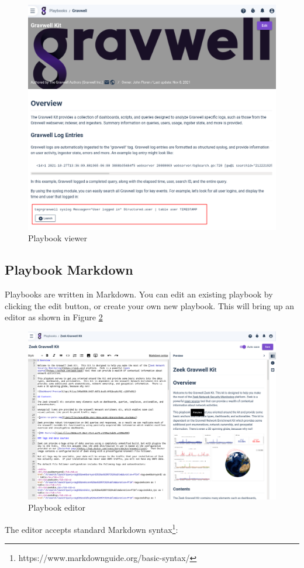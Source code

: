 \begin{figure}
	\includegraphics[width=0.8\linewidth]{images/playbook-read.png}
	\caption{Playbook viewer}
	\label{fig:playbook-read}
\end{figure}

\subsection{Playbook Markdown}
Playbooks are written in Markdown. You can edit an existing playbook by clicking the edit button, or create your own new playbook. This will bring up an editor as shown in Figure \ref{fig:playbook-edit}

\begin{figure}
	\includegraphics[width=0.8\linewidth]{images/playbook-edit.png}
	\caption{Playbook editor}
	\label{fig:playbook-edit}
\end{figure}

The editor accepts standard Markdown syntax\footnote{https://www.markdownguide.org/basic-syntax/}:

